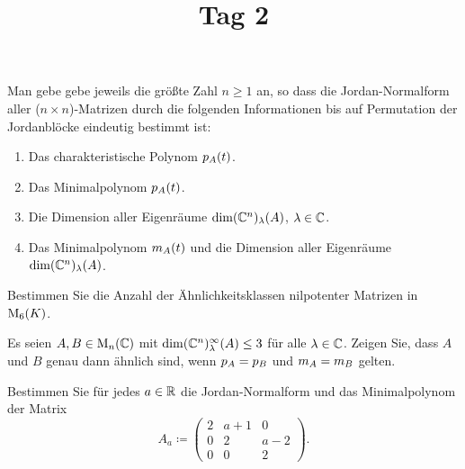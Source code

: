 \documentclass[a4paper, 10pt]{scrartcl}
\title{Tag 2}
\author{}
\date{}
\begin{document}
\begin{question}
  Man gebe gebe jeweils die größte Zahl $n \geq 1$ an, so dass die Jordan-Normalform aller ($n \times n$)-Matrizen durch die folgenden Informationen bis auf Permutation der Jordanblöcke eindeutig bestimmt ist:
  \begin{enumerate}
    \item
      Das charakteristische Polynom $p_{A}(t)$.
    \item
      Das Minimalpolynom $p_{A}(t)$.
    \item
      Die Dimension aller Eigenräume $\dim (\mathbb{C}^n)_{\lambda}(A)$, $\lambda \in \mathbb{C}$.
    \item
      Das Minimalpolynom $m_{A}(t)$ und die Dimension aller Eigenräume $\dim (\mathbb{C}^n)_{\lambda}(A)$.
  \end{enumerate}
\end{question}


\begin{question}
  Bestimmen Sie die Anzahl der Ähnlichkeitsklassen nilpotenter Matrizen in $\operatorname{M}_{6}(K)$.
\end{question}


\begin{question}
  Es seien $A, B \in \operatorname{M}_{n}(\mathbb{C})$ mit $\dim (\mathbb{C}^n)_{\lambda}^{\infty}(A) \leq 3$ für alle $\lambda \in \mathbb{C}$.
  Zeigen Sie, dass $A$ und $B$ genau dann ähnlich sind, wenn $p_{A} = p_{B}$ und $m_{A} = m_{B}$ gelten.
\end{question}





\begin{question}
  Bestimmen Sie für jedes $a \in \mathbb{R}$ die Jordan-Normalform und das Minimalpolynom der Matrix
  \[
              A_a
    \coloneqq \begin{pmatrix}
                2 & a+1 &  0  \\
                0 &  2  & a-2 \\
                0 &  0  &  2
              \end{pmatrix}.
  \]
\end{question}
\end{document}
